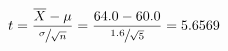 \begin{equation*}
    t=\frac{\overline{X}-\mu}{\sfrac{\sigma}{\sqrt{n}}}
    =\frac{64.0-60.0}{\sfrac{1.6}{\sqrt{5}}}=5.6569
    \end{equation*}